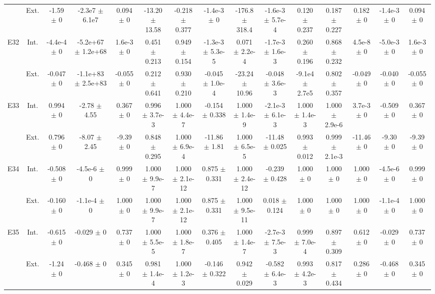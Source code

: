 \begin{table}[htbp]
{\begin{tabular}{@{}ccccccccccccccc@{}}
 & Ext. & -1.59 $\pm$ 0 & -2.3e7 $\pm$ 6.1e7 & 0.094 $\pm$ 0 & -13.20 $\pm$ 13.58 & -0.218 $\pm$ 0.377 & -1.4e-3 $\pm$ 0 & -176.8 $\pm$ 318.4 & -1.6e-3 $\pm$ 5.7e-4 & 0.120 $\pm$ 0.237 & 0.187 $\pm$ 0.227 & 0.182 $\pm$ 0 & -1.4e-3 $\pm$ 0 & 0.094 $\pm$ 0 \\
\cline{2-15}
\multirow{2}{*}{E32} & Int. & -4.4e-4 $\pm$ 0 & -5.2e+67 $\pm$ 1.2e+68 & 1.6e-3 $\pm$ 0 & 0.451 $\pm$ 0.213 & 0.949 $\pm$ 0.154 & -1.3e-3 $\pm$ 5.3e-5 & 0.071 $\pm$ 2.2e-4 & -1.7e-3 $\pm$ 1.6e-3 & 0.260 $\pm$ 0.196 & 0.868 $\pm$ 0.232 & 4.5e-8 $\pm$ 0 & -5.0e-3 $\pm$ 0 & 1.6e-3 $\pm$ 0 \\
 & Ext. & -0.047 $\pm$ 0 & -1.1e+83 $\pm$ 2.5e+83 & -0.055 $\pm$ 0 & 0.212 $\pm$ 0.641 & 0.930 $\pm$ 0.210 & -0.045 $\pm$ 1.0e-4 & -23.24 $\pm$ 10.96 & -0.048 $\pm$ 3.6e-3 & -9.1e4 $\pm$ 2.7e5 & 0.802 $\pm$ 0.357 & -0.049 $\pm$ 0 & -0.040 $\pm$ 0 & -0.055 $\pm$ 0 \\
\cline{2-15}
\multirow{2}{*}{E33} & Int. & 0.994 $\pm$ 0 & -2.78 $\pm$ 4.55 & 0.367 $\pm$ 0 & 0.996 $\pm$ 3.7e-3 & 1.000 $\pm$ 4.4e-7 & -0.154 $\pm$ 0.338 & 1.000 $\pm$ 1.4e-9 & -2.1e-3 $\pm$ 6.1e-3 & 1.000 $\pm$ 1.4e-3 & 1.000 $\pm$ 2.9e-6 & 3.7e-3 $\pm$ 0 & -0.509 $\pm$ 0 & 0.367 $\pm$ 0 \\
 & Ext. & 0.796 $\pm$ 0 & -8.07 $\pm$ 2.45 & -9.39 $\pm$ 0 & 0.848 $\pm$ 0.295 & 1.000 $\pm$ 6.9e-4 & -11.86 $\pm$ 1.81 & 1.000 $\pm$ 6.5e-5 & -11.48 $\pm$ 0.025 & 0.993 $\pm$ 0.012 & 0.999 $\pm$ 2.1e-3 & -11.46 $\pm$ 0 & -9.30 $\pm$ 0 & -9.39 $\pm$ 0 \\
\cline{2-15}
\multirow{2}{*}{E34} & Int. & -0.508 $\pm$ 0 & -4.5e-6 $\pm$ 0 & 0.999 $\pm$ 0 & 1.000 $\pm$ 9.9e-7 & 1.000 $\pm$ 2.1e-12 & 0.875 $\pm$ 0.331 & 1.000 $\pm$ 2.4e-12 & -0.239 $\pm$ 0.428 & 1.000 $\pm$ 0 & 1.000 $\pm$ 0 & 1.000 $\pm$ 0 & -4.5e-6 $\pm$ 0 & 0.999 $\pm$ 0 \\
 & Ext. & -0.160 $\pm$ 0 & -1.1e-4 $\pm$ 0 & 1.000 $\pm$ 0 & 1.000 $\pm$ 9.9e-7 & 1.000 $\pm$ 2.1e-12 & 0.875 $\pm$ 0.331 & 1.000 $\pm$ 9.5e-11 & 0.018 $\pm$ 0.124 & 1.000 $\pm$ 0 & 1.000 $\pm$ 0 & 1.000 $\pm$ 0 & -1.1e-4 $\pm$ 0 & 1.000 $\pm$ 0 \\
\cline{2-15}
\multirow{2}{*}{E35} & Int. & -0.615 $\pm$ 0 & -0.029 $\pm$ 0 & 0.737 $\pm$ 0 & 1.000 $\pm$ 5.5e-5 & 1.000 $\pm$ 1.8e-7 & 0.376 $\pm$ 0.405 & 1.000 $\pm$ 1.4e-7 & -2.7e-3 $\pm$ 7.5e-3 & 0.999 $\pm$ 7.0e-4 & 0.897 $\pm$ 0.309 & 0.612 $\pm$ 0 & -0.029 $\pm$ 0 & 0.737 $\pm$ 0 \\
 & Ext. & -1.24 $\pm$ 0 & -0.468 $\pm$ 0 & 0.345 $\pm$ 0 & 0.981 $\pm$ 1.4e-4 & 1.000 $\pm$ 1.2e-3 & -0.146 $\pm$ 0.322 & 0.942 $\pm$ 0.029 & -0.582 $\pm$ 6.4e-3 & 0.993 $\pm$ 4.2e-3 & 0.817 $\pm$ 0.434 & 0.286 $\pm$ 0 & -0.468 $\pm$ 0 & 0.345 $\pm$ 0 \\

\end{tabular}}
\end{table}
